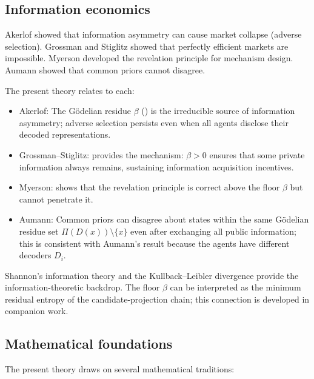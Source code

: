 \documentclass[twocolumn,11pt,a4paper]{article}
\begin{document}
\subsection{Information economics}
\label{sec:lit:info}

Akerlof \cite{akerlof1970} showed that information asymmetry can cause
market collapse (adverse selection).  Grossman and Stiglitz
\cite{grossmanstiglitz1980} showed that perfectly efficient markets are
impossible.  Myerson \cite{myerson1979} developed the revelation
principle for mechanism design.  Aumann \cite{aumann1976} showed that
common priors cannot disagree.

The present theory relates to each:

\begin{itemize}[leftmargin=*]
  \item Akerlof: The G\"odelian residue $\beta$
    () is the irreducible source of
    information asymmetry; adverse selection persists even when all agents
    disclose their decoded representations.
  \item Grossman--Stiglitz:  provides the
    mechanism: $\beta>0$ ensures that some private information always
    remains, sustaining information acquisition incentives.
  \item Myerson:  shows that the revelation
    principle is correct above the floor $\beta$ but cannot penetrate it.
  \item Aumann: Common priors can disagree about states within the same
    G\"odelian residue set $\Pi(D(x))\setminus\{x\}$ even after
    exchanging all public information; this is consistent with Aumann's
    result because the agents have different decoders $D_i$.
\end{itemize}

Shannon's information theory \cite{shannon1948} and the
Kullback--Leibler divergence \cite{kullbackleibler1951} provide the
information-theoretic backdrop.  The floor $\beta$ can be interpreted as
the minimum residual entropy of the candidate-projection chain; this
connection is developed in companion work.

\subsection{Mathematical foundations}
\label{sec:lit:math}

The present theory draws on several mathematical traditions:
\end{document}
